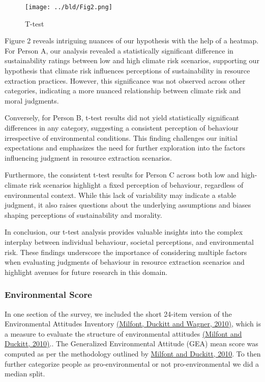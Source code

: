 \documentclass[11pt, a4paper, leqno]{article}
\begin{document}
\begin{figure}[H]
  \centering
  \texttt{[image: ../bld/Fig2.png]} 
  \caption{T-test}
\end{figure}

Figure 2 reveals intriguing nuances of our hypothesis with the help of a heatmap. For Person A, our analysis revealed a statistically significant difference in sustainability ratings between low and high climate risk scenarios, supporting our hypothesis that climate risk influences perceptions of sustainability in resource extraction practices. However, this significance was not observed across other categories, indicating a more nuanced relationship between climate risk and moral judgments.


Conversely, for Person B, t-test results did not yield statistically significant differences in any category, suggesting a consistent perception of behaviour irrespective of environmental conditions. This finding challenges our initial expectations and emphasizes the need for further exploration into the factors influencing judgment in resource extraction scenarios.

Furthermore, the consistent t-test results for Person C across both low and high-climate risk scenarios highlight a fixed perception of behaviour, regardless of environmental context. While this lack of variability may indicate a stable judgment, it also raises questions about the underlying assumptions and biases shaping perceptions of sustainability and morality.

In conclusion, our t-test analysis provides valuable insights into the complex interplay between individual behaviour, societal perceptions, and environmental risk. These findings underscore the importance of considering multiple factors when evaluating judgments of behaviour in resource extraction scenarios and highlight avenues for future research in this domain.

\subsubsection{Environmental Score}

In one section of the survey, we included the short 24-item version of the Environmental Attitudes Inventory \href{https://api.semanticscholar.org/CorpusID:59149978}{ (Milfont, Duckitt and Wagner, 2010)}, which is a measure to evaluate the structure of environmental attitudes \href{https://doi.org/10.1016/j.jenvp.2009.09.001}{(Milfont and Duckitt, 2010)}.. The Generalized Environmental Attitude (GEA) mean score was computed as per the methodology outlined by \href{https://doi.org/10.1016/j.jenvp.2009.09.001}{Milfont and Duckitt, 2010}. To then further categorize people as pro-environmental or not pro-environmental we did a median split.
\end{document}
